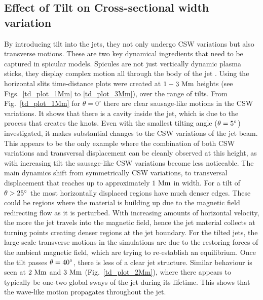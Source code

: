 \subsection{Effect of Tilt on Cross-sectional width variation}
\label{subsec:oscillating}
By introducing tilt into the jets, they not only undergo CSW variations but also transverse motions. These are two key dynamical ingredients that need to be captured in spicular models. Spicules are not just vertically dynamic plasma sticks, they display complex motion all through the body of the jet \citep{Sharma2018ApJ85361S}. \np
%
Using the horizontal slits time-distance plots were created at $1-3~\rm{Mm}$ heights (see Figs.~\ref{td_plot_1Mm} to \ref{td_plot_3Mm}), over the range of tilts. From Fig.~\ref{td_plot_1Mm} for $\theta=0^{\circ}$ there are clear sausage-like motions in the CSW variations. It shows that there is a cavity inside the jet, which is due to the process that creates the knots. Even with the smallest tilting angle ($\theta=5^{\circ}$) investigated, it makes substantial changes to the CSW variations of the jet beam. This appears to be the only example where the combination of both CSW variations and transversal displacement can be cleanly observed at this height, as with increasing tilt the sausage-like CSW variations become less noticeable. The main dynamics shift from symmetrically CSW variations, to transversal displacement that reaches up to approximately $1~\rm{Mm}$ in width. For a tilt of $\theta>25^{\circ}$ the most horizontally displaced regions have much denser edges. These could be regions where the material is building up due to the magnetic field redirecting flow as it is perturbed. With increasing amounts of horizontal velocity, the more the jet travels into the magnetic field, hence the jet material collects at turning points creating denser regions at the jet boundary. For the tilted jets, the large scale transverse motions in the simulations are due to the restoring forces of the ambient magnetic field, which are trying to re-establish an equilibrium. Once the tilt passes $\theta=40^{\circ}$, there is less of a clear jet structure. Similar behaviour is seen at $2~\rm{Mm}$ and $3~\rm{Mm}$ (Fig.~\ref{td_plot_2Mm}), where there appears to typically be one-two global sways of the jet during its lifetime. This shows that the wave-like motion propagates throughout the jet. \np
%
